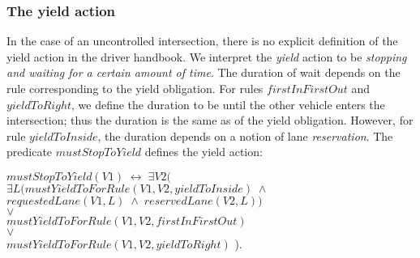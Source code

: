 \subsubsection{The yield action}
In the case of an uncontrolled intersection,
there is no explicit definition of the yield action in the driver handbook.
We interpret the \emph{yield} action to be \emph{stopping and waiting for a certain amount of time}.
The duration of wait depends on the rule corresponding to the yield obligation.
For rules $firstInFirstOut$ and $yieldToRight$,
we define the duration to be 
until the other vehicle enters the intersection;
thus the duration is 
the same as of the yield obligation.
However,
for rule $yieldToInside$,
the duration depends on a notion of lane \emph{reservation}.
The predicate $mustStopToYield$ defines the yield action:
\begin{center}
    $ mustStopToYield(V1) \; \leftrightarrow \; \exists V2 \Bigg( $ \\
    $ \exists L \Big(  mustYieldToForRule(V1, V2, yieldToInside) \; \land $\\
    $ requestedLane(V1, L) \; \land \; reservedLane(V2, L) \Big) $\\
    $ \lor $ \\
    $ mustYieldToForRule(V1, V2, firstInFirstOut) $ \\
    $ \lor $ \\
    $ mustYieldToForRule(V1, V2, yieldToRight) $ \Bigg).
\end{center}
